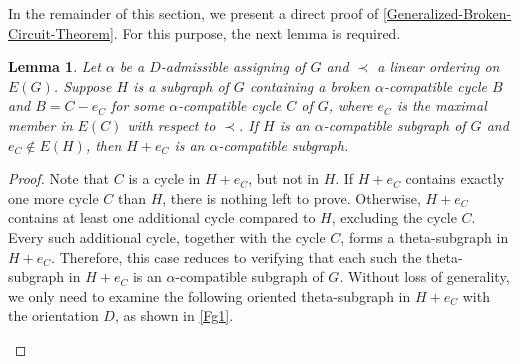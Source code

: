\documentclass[12pt]{article}%
\numberwithin{equation}{section}
\def\i{\mbox{\rm (\hspace{0.2mm}i\hspace{0.2mm})}\,}
\newtheorem{lemma}[lemma]{Lemma}
\begin{document}
In the remainder of this section, we present a direct proof of  \autoref{Generalized-Broken-Circuit-Theorem}. For this purpose, the next lemma is required.
\begin{lemma}\label{No-Broken-Circuit}
Let $\alpha$ be a $D$-admissible assigning of $G$ and $\prec$ a linear ordering on $E(G)$. Suppose $H$ is a subgraph of $G$ containing a broken $\alpha$-compatible cycle $B$ and $B=C-e_C$ for some $\alpha$-compatible cycle $C$ of $G$, where $e_C$ is the maximal member in $E(C)$ with respect to $\prec$. If $H$ is an $\alpha$-compatible subgraph of $G$ and $e_C\notin E(H)$, then $H+e_C$ is an $\alpha$-compatible subgraph.
\end{lemma}
\begin{proof}
Note that $C$ is a cycle in $H+e_C$, but not in $H$. If $H+e_C$ contains exactly one more cycle $C$ than $H$, there is nothing left to prove. Otherwise, $H+e_C$ contains at least one additional cycle compared to $H$, excluding the cycle $C$. Every such additional cycle, together with the cycle $C$, forms a theta-subgraph in $H+e_C$. Therefore, this case reduces to verifying that each such the theta-subgraph in $H+e_C$ is an $\alpha$-compatible subgraph of $G$. Without loss of generality, we only need to examine the following oriented theta-subgraph in $H+e_C$ with the orientation $D$, as shown in \autoref{Fg1}.
\begin{figure}[H]
\centering
{}
\end{figure}
\end{proof}
\end{document}
